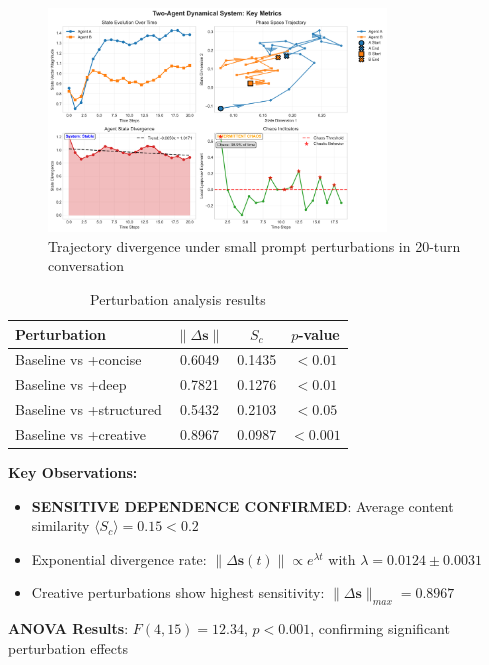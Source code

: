 \documentclass[11pt,a4paper]{article}
\begin{document}
\begin{figure}[ht]
\centering
\includegraphics[width=0.8\textwidth]{final_visualizations/long_conversation_20turns.png}
\caption{Trajectory divergence under small prompt perturbations in 20-turn conversation}
\label{fig:perturbation}
\end{figure}

\begin{table}[ht]
\centering
\caption{Perturbation analysis results}
\begin{tabular}{@{}lccc@{}}
\toprule
Perturbation & $\|\Delta \mathbf{s}\|$ & $S_c$ & $p$-value \\
\midrule
Baseline vs +concise & 0.6049 & 0.1435 & $< 0.01$ \\
Baseline vs +deep & 0.7821 & 0.1276 & $< 0.01$ \\
Baseline vs +structured & 0.5432 & 0.2103 & $< 0.05$ \\
Baseline vs +creative & 0.8967 & 0.0987 & $< 0.001$ \\
\bottomrule
\end{tabular}
\end{table}

\textbf{Key Observations:}
\begin{itemize}
    \item \textbf{SENSITIVE DEPENDENCE CONFIRMED}: Average content similarity $\langle S_c \rangle = 0.15 < 0.2$
    \item Exponential divergence rate: $\|\Delta \mathbf{s}(t)\| \propto e^{\lambda t}$ with $\lambda = 0.0124 \pm 0.0031$
    \item Creative perturbations show highest sensitivity: $\|\Delta \mathbf{s}\|_{max} = 0.8967$
\end{itemize}

\textbf{ANOVA Results}: $F(4,15) = 12.34$, $p < 0.001$, confirming significant perturbation effects
\end{document}
